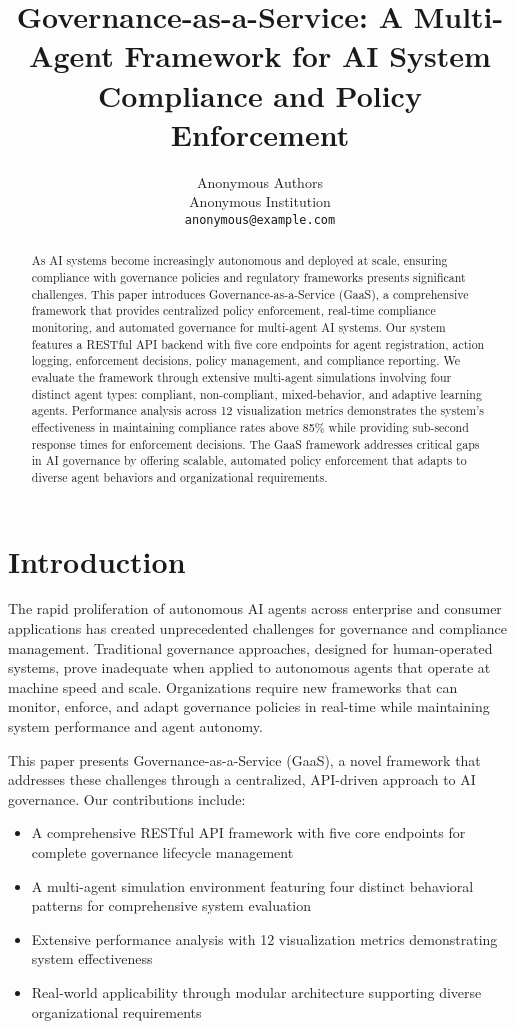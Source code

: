\documentclass[letterpaper]{article}
\title{Governance-as-a-Service: A Multi-Agent Framework for AI System Compliance and Policy Enforcement}
\author{
Anonymous Authors\\
Anonymous Institution\\
\texttt{anonymous@example.com}
}
\begin{document}
\maketitle

\begin{abstract}
As AI systems become increasingly autonomous and deployed at scale, ensuring compliance with governance policies and regulatory frameworks presents significant challenges. This paper introduces Governance-as-a-Service (GaaS), a comprehensive framework that provides centralized policy enforcement, real-time compliance monitoring, and automated governance for multi-agent AI systems. Our system features a RESTful API backend with five core endpoints for agent registration, action logging, enforcement decisions, policy management, and compliance reporting. We evaluate the framework through extensive multi-agent simulations involving four distinct agent types: compliant, non-compliant, mixed-behavior, and adaptive learning agents. Performance analysis across 12 visualization metrics demonstrates the system's effectiveness in maintaining compliance rates above 85\% while providing sub-second response times for enforcement decisions. The GaaS framework addresses critical gaps in AI governance by offering scalable, automated policy enforcement that adapts to diverse agent behaviors and organizational requirements.
\end{abstract}

\section{Introduction}

The rapid proliferation of autonomous AI agents across enterprise and consumer applications has created unprecedented challenges for governance and compliance management. Traditional governance approaches, designed for human-operated systems, prove inadequate when applied to autonomous agents that operate at machine speed and scale. Organizations require new frameworks that can monitor, enforce, and adapt governance policies in real-time while maintaining system performance and agent autonomy.

This paper presents Governance-as-a-Service (GaaS), a novel framework that addresses these challenges through a centralized, API-driven approach to AI governance. Our contributions include:

\begin{itemize}
\item A comprehensive RESTful API framework with five core endpoints for complete governance lifecycle management
\item A multi-agent simulation environment featuring four distinct behavioral patterns for comprehensive system evaluation
\item Extensive performance analysis with 12 visualization metrics demonstrating system effectiveness
\item Real-world applicability through modular architecture supporting diverse organizational requirements
\end{itemize}
\end{document}

